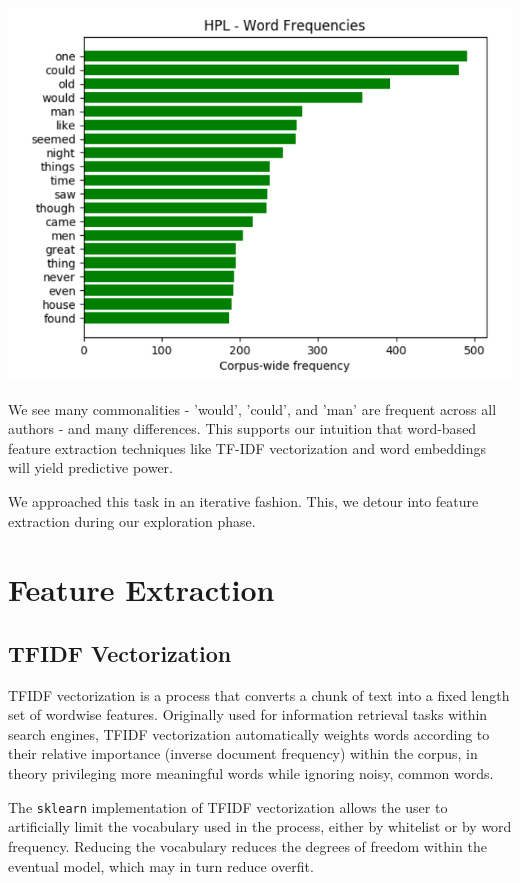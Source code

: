 \documentclass[12pt]{article}
\begin{document}
\vskip 0.2in
\includegraphics[scale=.40, center]{images/word_freq_hpl.png}
\vskip 0.2in

We see many commonalities - 'would', 'could', and 'man' are frequent across all authors - and many differences. This supports our intuition that word-based feature extraction techniques like TF-IDF vectorization and word embeddings will yield predictive power.

We approached this task in an iterative fashion. This, we detour into feature extraction during our exploration phase.

\section{Feature Extraction}

\subsection{TFIDF Vectorization}
TFIDF vectorization is a process that converts a chunk of text into
a fixed length set of wordwise features. Originally used for information retrieval tasks within search engines, TFIDF vectorization automatically weights words according to their relative importance (inverse document frequency) within the corpus, in theory privileging more meaningful words while ignoring noisy, common words.

The \texttt{sklearn} implementation of TFIDF vectorization allows the user to artificially limit the vocabulary used in the process, either by whitelist or by word frequency. Reducing the vocabulary reduces the degrees of freedom within the eventual model, which may in turn reduce overfit.
\end{document}
